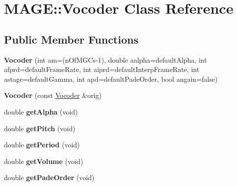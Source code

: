 \hypertarget{class_m_a_g_e_1_1_vocoder}{\section{M\-A\-G\-E\-:\-:Vocoder Class Reference}
\label{class_m_a_g_e_1_1_vocoder}
}
\subsection*{Public Member Functions}
\begin{DoxyCompactItemize}
\item 
\hypertarget{class_m_a_g_e_1_1_vocoder_a0c949814cc5263ae226c23fb5ca7abf4}{{\bfseries Vocoder} (int am=(n\-Of\-M\-G\-Cs-\/1), double aalpha=default\-Alpha, int afprd=default\-Frame\-Rate, int aiprd=default\-Interp\-Frame\-Rate, int astage=default\-Gamma, int apd=default\-Pade\-Order, bool angain=false)}\label{class_m_a_g_e_1_1_vocoder_a0c949814cc5263ae226c23fb5ca7abf4}

\item 
\hypertarget{class_m_a_g_e_1_1_vocoder_aa6fcee8597d4c652f069e329ac115e42}{{\bfseries Vocoder} (const \hyperlink{class_m_a_g_e_1_1_vocoder}{Vocoder} \&orig)}\label{class_m_a_g_e_1_1_vocoder_aa6fcee8597d4c652f069e329ac115e42}

\item 
\hypertarget{class_m_a_g_e_1_1_vocoder_af5b257b55f3200e733a96af8b8e1013f}{double {\bfseries get\-Alpha} (void)}\label{class_m_a_g_e_1_1_vocoder_af5b257b55f3200e733a96af8b8e1013f}

\item 
\hypertarget{class_m_a_g_e_1_1_vocoder_a2e3e6b7d223c8e253901a30709b39100}{double {\bfseries get\-Pitch} (void)}\label{class_m_a_g_e_1_1_vocoder_a2e3e6b7d223c8e253901a30709b39100}

\item 
\hypertarget{class_m_a_g_e_1_1_vocoder_a76b9cc7b27f27760b8f6d4c2f14cd2ed}{double {\bfseries get\-Period} (void)}\label{class_m_a_g_e_1_1_vocoder_a76b9cc7b27f27760b8f6d4c2f14cd2ed}

\item 
\hypertarget{class_m_a_g_e_1_1_vocoder_a5f5bb1141cc727462434116b9dd24e42}{double {\bfseries get\-Volume} (void)}\label{class_m_a_g_e_1_1_vocoder_a5f5bb1141cc727462434116b9dd24e42}

\item 
\hypertarget{class_m_a_g_e_1_1_vocoder_a9d4b3e4f17d2a710eb29c18acfd2db09}{double {\bfseries get\-Pade\-Order} (void)}\label{class_m_a_g_e_1_1_vocoder_a9d4b3e4f17d2a710eb29c18acfd2db09}


\end{DoxyCompactItemize}
